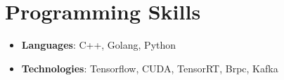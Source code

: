 \documentclass[letterpaper,11pt]{article}
\newcommand{\resumeItem}[2]{
  \item\small{
    \textbf{#1}{: #2 \vspace{-2pt}}
  }
}
\newcommand{\resumeSubItem}[2]{\resumeItem{#1}{#2}\vspace{-4pt}}
\newcommand{\resumeSubHeadingListStart}{\begin{itemize}[leftmargin=*]}
\newcommand{\resumeSubHeadingListEnd}{\end{itemize}}
\begin{document}
\section{Programming Skills}
  \resumeSubHeadingListStart
    \resumeSubItem{Languages}
      {C++, Golang, Python}
    \resumeSubItem{Technologies}
      {Tensorflow, CUDA, TensorRT, Brpc, Kafka}
  \resumeSubHeadingListEnd


\end{document}
